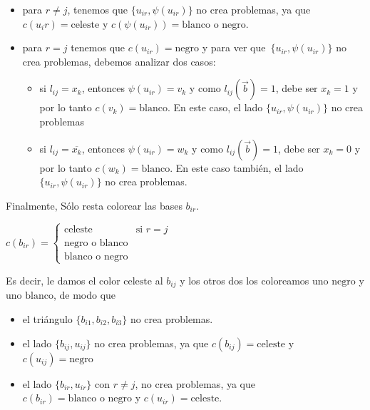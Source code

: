 \documentclass[10pt,a4paper]{article}
\begin{document}
\begin{itemize}

	\item para $r \neq j$, tenemos que $\{u_{ir},\psi(u_{ir})\}$ no crea problemas, ya que $c(u_ir) = \text{celeste}$ y $c(\psi(u_{ir})) = \text{blanco o negro}$.
	\item para $r= j$ tenemos que $c(u_{ir}) = \text{negro}$ y para ver que $\{u_{ir},\psi(u_{ir})\}$ no crea problemas, debemos analizar dos casos:
	\begin{itemize}

		\item si $l_{ij} = x_k$, entonces $\psi(u_{ir}) = v_k$ y como $l_{ij}(\overrightarrow{b}) = 1$, debe ser $x_k = 1$ y por lo tanto $c(v_k) = \text{blanco}$. En este caso, el lado $\{u_{ir},\psi(u_{ir})\}$ no crea problemas
		\item si $l_{ij} = \overline{x_k}$, entonces $\psi(u_{ir}) = w_k$ y como $l_{ij}(\overrightarrow{b}) = 1$, debe ser $x_k = 0$ y por lo tanto $c(w_k) = \text{blanco}$. En este caso también, el lado $\{u_{ir},\psi(u_{ir})\}$ no crea problemas.
	\end{itemize}
	
\end{itemize}

Finalmente, Sólo resta colorear las bases $b_{ir}$.

\begin{center}
$c(b_{ir}) = \begin{cases} \text{celeste} & \text{si } r = j\\ \text{negro o blanco}\\ \text{blanco o negro} \end{cases}$
\end{center}

Es decir, le damos el color $\text{celeste}$ al $b_{ij}$ y los otros dos los coloreamos uno $\text{negro}$ y uno $\text{blanco}$, de modo que

\begin{itemize}

	\item el triángulo $\{b_{i1}, b_{i2}, b_{i3}\}$ no crea problemas.
	\item el lado $\{b_{ij}, u_{ij}\}$ no crea problemas, ya que $c(b_{ij}) = \text{celeste}$ y $c(u_{ij}) = \text{negro}$
	\item el lado $\{b_{ir}, u_{ir}\}$ con $r \neq j$, no crea problemas, ya que $c(b_{ir}) = \text{blanco o negro}$ y $c(u_{ir}) = \text{celeste}$.
\end{itemize}


\end{document}
